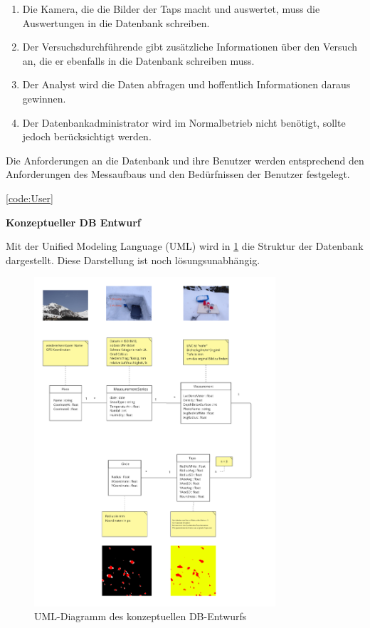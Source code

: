 \begin{enumerate}
\item Die Kamera, die die Bilder der Taps macht und auswertet, muss die Auswertungen in die Datenbank schreiben.
  \item Der Versuchsdurchführende gibt zusätzliche Informationen über den Versuch an, die er ebenfalls in die Datenbank schreiben muss.
    
    \item Der Analyst wird die Daten abfragen und hoffentlich Informationen daraus gewinnen.
    
    \item Der Datenbankadministrator wird im Normalbetrieb nicht benötigt, sollte jedoch berücksichtigt werden.
\end{enumerate}

Die Anforderungen an die Datenbank und ihre Benutzer werden entsprechend den Anforderungen des Messaufbaus und den Bedürfnissen der Benutzer festgelegt.

\ref{code:User}

\textbf{Konzeptueller DB Entwurf}

Mit der Unified Modeling Language (UML) wird in  \ref{fig:uml-db-entwurf} die Struktur der Datenbank dargestellt. Diese Darstellung ist noch lösungsunabhängig.

\begin{figure}
    \centering
    \includegraphics[width=0.8\textwidth]{Bilder/Screenshotfrom2024-04-1418-05-35.png}
    \caption{UML-Diagramm des konzeptuellen DB-Entwurfs}
    \label{fig:uml-db-entwurf}
\end{figure}



